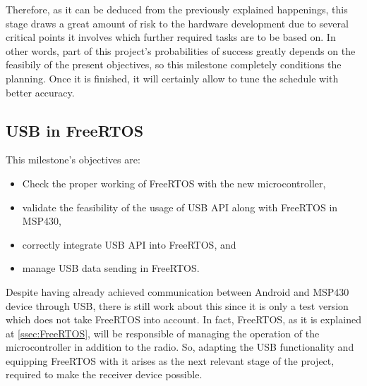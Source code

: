 		\begin{comment}
		That was wtih no doubts the harder and more dangerous part of the research, there was a lot of 
		chances to do not achieve our goal and the hard work of all the team was essential. This milestone 
		suppose a very important fact not only in hardware part but in all the project because now, we can 
		more accurately schedule all of the project. \\
		\end{comment}
		Therefore, as it can be deduced from the previously explained happenings, this stage draws a great amount 
		of risk to the hardware development due to several critical points it involves which further required
		tasks are to be based on. In other words, part of this project's probabilities of success greatly depends
		on the feasibily of the present objectives, so this milestone completely conditions the planning. Once 
		it is finished, it will certainly allow to tune the schedule with better accuracy.

	\subsection{USB in FreeRTOS}
	\label{ssec:USB.FreeRTOS}	
		This milestone's objectives are:
		\begin{itemize}
			\item Check the proper working of FreeRTOS with the new microcontroller,
			\item validate the feasibility of the usage of USB API along with FreeRTOS in MSP430,
			\item correctly integrate USB API into FreeRTOS, and
			\item manage USB data sending in FreeRTOS.
		\end{itemize}

		Despite having already achieved communication between Android and MSP430 device through USB, there is
		still work about this since it is only a test version which does not take FreeRTOS into account. In fact,
		FreeRTOS, as it is explained at \autoref{ssec:FreeRTOS}, will be responsible of managing the operation of
		the microcontroller in addition to the radio. So, adapting the USB functionality and equipping FreeRTOS
		with it arises as the next relevant stage of the project, required to make the receiver device possible.\\

